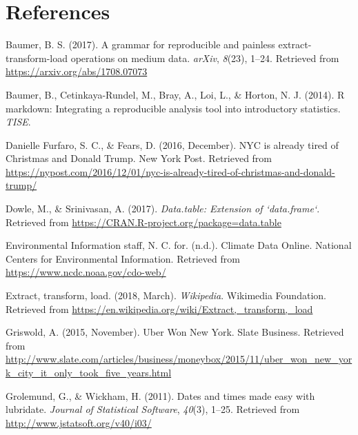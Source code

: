 \documentclass[12pt,twoside]{reedthesis}
\theoremstyle{definition}
\theoremstyle{definition}
\theoremstyle{definition}
\theoremstyle{remark}
\begin{document}
\chapter*{References}\label{references}


\noindent

\setlength{\parindent}{-0.20in} \setlength{\leftskip}{0.20in}
\setlength{\parskip}{8pt}

\hypertarget{refs}{}
\hypertarget{ref-pkgetl}{}
Baumer, B. S. (2017). A grammar for reproducible and painless
extract-transform-load operations on medium data. \emph{arXiv},
\emph{8}(23), 1--24. Retrieved from
\url{https://arxiv.org/abs/1708.07073}

\hypertarget{ref-baumer2014}{}
Baumer, B., Cetinkaya-Rundel, M., Bray, A., Loi, L., \& Horton, N. J.
(2014). R markdown: Integrating a reproducible analysis tool into
introductory statistics. \emph{TISE}.

\hypertarget{ref-furfaro2016}{}
Danielle Furfaro, S. C., \& Fears, D. (2016, December). NYC is already
tired of Christmas and Donald Trump. New York Post. Retrieved from
\url{https://nypost.com/2016/12/01/nyc-is-already-tired-of-christmas-and-donald-trump/}

\hypertarget{ref-pkgdatatable}{}
Dowle, M., \& Srinivasan, A. (2017). \emph{Data.table: Extension of
`data.frame`}. Retrieved from
\url{https://CRAN.R-project.org/package=data.table}

\hypertarget{ref-noaa}{}
Environmental Information staff, N. C. for. (n.d.). Climate Data Online.
National Centers for Environmental Information. Retrieved from
\url{https://www.ncdc.noaa.gov/cdo-web/}

\hypertarget{ref-wikipedia}{}
Extract, transform, load. (2018, March). \emph{Wikipedia}. Wikimedia
Foundation. Retrieved from
\url{https://en.wikipedia.org/wiki/Extract,_transform,_load}

\hypertarget{ref-ubernyc}{}
Griswold, A. (2015, November). Uber Won New York. Slate Business.
Retrieved from
\url{http://www.slate.com/articles/business/moneybox/2015/11/uber_won_new_york_city_it_only_took_five_years.html}

\hypertarget{ref-pkglubridate}{}
Grolemund, G., \& Wickham, H. (2011). Dates and times made easy with
lubridate. \emph{Journal of Statistical Software}, \emph{40}(3), 1--25.
Retrieved from \url{http://www.jstatsoft.org/v40/i03/}
\end{document}
